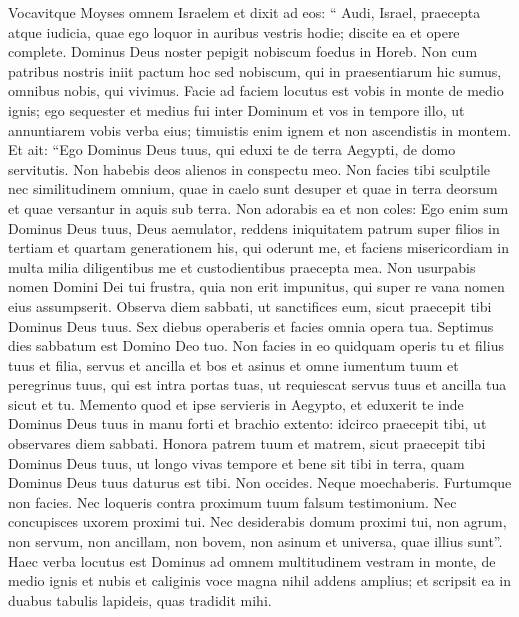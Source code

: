 \begin{biblechapter}
\begin{biblechapter}
\begin{biblechapter}
\begin{biblechapter}
\begin{biblechapter}
\verse Vocavitque Moyses omnem Israelem et dixit ad eos: “ Audi, Israel, praecepta atque iudicia, quae ego loquor in auribus vestris hodie; discite ea et opere complete. 
\verse Dominus Deus noster pepigit nobiscum foedus in Horeb. 
\verse Non cum patribus nostris iniit pactum hoc sed nobiscum, qui in praesentiarum hic sumus, omnibus nobis, qui vivimus. 
\verse Facie ad faciem locutus est vobis in monte de medio ignis; 
 \verse ego sequester et medius fui inter Dominum et vos in tempore illo, ut annuntiarem vobis verba eius; timuistis enim ignem et non ascendistis in montem. Et ait:
 \verse “Ego Dominus Deus tuus, qui eduxi te de terra Aegypti, de domo servitutis.
 \verse Non habebis deos alienos in conspectu meo.
 \verse Non facies tibi sculptile nec similitudinem omnium, quae in caelo sunt desuper et quae in terra deorsum et quae versantur in aquis sub terra. 
\verse Non adorabis ea et non coles: Ego enim sum Dominus Deus tuus, Deus aemulator, reddens iniquitatem patrum super filios in tertiam et quartam generationem his, qui oderunt me, 
\verse et faciens misericordiam in multa milia diligentibus me et custodientibus praecepta mea.
 \verse Non usurpabis nomen Domini Dei tui frustra, quia non erit impunitus, qui super re vana nomen eius assumpserit. 
\verse Observa diem sabbati, ut sanctifices eum, sicut praecepit tibi Dominus Deus tuus. 
\verse Sex diebus operaberis et facies omnia opera tua. 
\verse Septimus dies sabbatum est Domino Deo tuo. Non facies in eo quidquam operis tu et filius tuus et filia, servus et ancilla et bos et asinus et omne iumentum tuum et peregrinus tuus, qui est intra portas tuas, ut requiescat servus tuus et ancilla tua sicut et tu. 
\verse Memento quod et ipse servieris in Aegypto, et eduxerit te inde Dominus Deus tuus in manu forti et brachio extento: idcirco praecepit tibi, ut observares diem sabbati.
 \verse Honora patrem tuum et matrem, sicut praecepit tibi Dominus Deus tuus, ut longo vivas tempore et bene sit tibi in terra, quam Dominus Deus tuus daturus est tibi.
 \verse Non occides.
 \verse Neque moechaberis.
 \verse Furtumque non facies.
 \verse Nec loqueris contra proximum tuum falsum testimonium.
 \verse Nec concupisces uxorem proximi tui. Nec desiderabis domum proximi tui, non agrum, non servum, non ancillam, non bovem, non asinum et universa, quae illius sunt”.
 \verse Haec verba locutus est Dominus ad omnem multitudinem vestram in monte, de medio ignis et nubis et caliginis voce magna nihil addens amplius; et scripsit ea in duabus tabulis lapideis, quas tradidit mihi.

\end{biblechapter}
\end{biblechapter}
\end{biblechapter}
\end{biblechapter}
\end{biblechapter}
